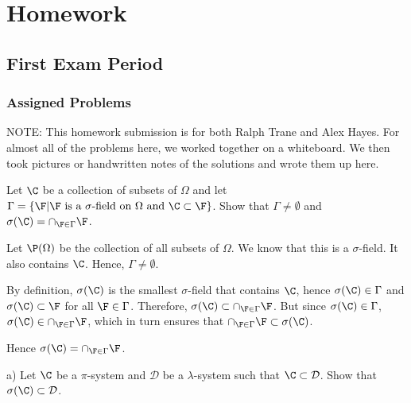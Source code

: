 \documentclass[]{book}
\theoremstyle{definition}
\theoremstyle{definition}
\theoremstyle{definition}
\theoremstyle{remark}
\let\BeginKnitrBlock\begin \let\EndKnitrBlock\end
\begin{document}
\chapter{Homework}\label{homework}

\section{First Exam Period}\label{first-exam-period}

\subsection{Assigned Problems}\label{assigned-problems}

NOTE: This homework submission is for both Ralph Trane and Alex Hayes.
For almost all of the problems here, we worked together on a whiteboard.
We then took pictures or handwritten notes of the solutions and wrote
them up here.

\BeginKnitrBlock{exercise}[Ex 2]
\protect\hypertarget{exr:unnamed-chunk-21}{}{\label{exr:unnamed-chunk-21}
\iffalse (Ex 2) \fi{} }Let \(\C\) be a collection of subsets of
\(\Omega\) and let
\(\Gamma = \{ \F | \F \text{ is a } \sigma \text{-field on } \Omega \text{ and } \C \subset \F \}\).
Show that \(\Gamma \neq \emptyset\) and
\(\sigma(\C) = \cap_{\F \in \Gamma} \F\).
\EndKnitrBlock{exercise}

\BeginKnitrBlock{solution}[Ex 2]
\iffalse{} {Solution (Ex 2). } \fi{}Let \(\P(\Omega)\) be the collection
of all subsets of \(\Omega\). We know that this is a \(\sigma\)-field.
It also contains \(\C\). Hence, \(\Gamma \neq \emptyset\).

By definition, \(\sigma(\C)\) is the smallest \(\sigma\)-field that
contains \(\C\), hence \(\sigma(\C) \in \Gamma\) and
\(\sigma(\C) \subset \F\) for all \(\F \in \Gamma\). Therefore,
\(\sigma(\C) \subset \cap_{\F \in \Gamma} \F\). But since
\(\sigma(\C) \in \Gamma\), \(\sigma(\C) \in \cap_{\F \in \Gamma} \F\),
which in turn ensures that
\(\cap_{\F \in \Gamma} \F \subset \sigma(\C)\).

Hence \(\sigma(\C) = \cap_{\F \in \Gamma} \F\).
\EndKnitrBlock{solution}

\BeginKnitrBlock{exercise}[Ex 5]
\protect\hypertarget{exr:unnamed-chunk-23}{}{\label{exr:unnamed-chunk-23}
\iffalse (Ex 5) \fi{} }a) Let \(\C\) be a \(\pi\)-system and
\(\mathcal{D}\) be a \(\lambda\)-system such that
\(\C \subset \mathcal{D}\). Show that
\(\sigma(\C) \subset \mathcal{D}\).
\EndKnitrBlock{exercise}
\end{document}
